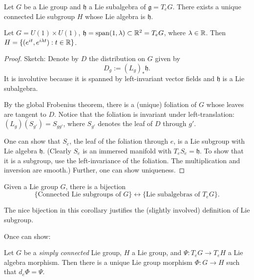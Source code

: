 \begin{prop}[C]
    Let $G$ be a Lie group and $\mathfrak h$ a Lie subalgebra of $\mathfrak g = T_eG$.
    There exists a unique connected Lie subgroup $H$ whose Lie algebra is $\mathfrak h$.
\end{prop}
\begin{eg}
    Let $G = U(1) \times U(1)$, $\mathfrak h = \operatorname{span}(1, \lambda) \subset  \mathbb{R}^2 = T_eG$, where $\lambda \in \mathbb{R}$.
    Then $H = \{(e^{it}, e^{i \lambda t}) : t \in \mathbb{R}\}$.
\end{eg}
\vspace*{12pt}
\begin{proof} Sketch:
    Denote by $D$ the distribution on $G$ given by 
    \[
        D_g := (L_g)_* \mathfrak h
    .\] 
It is involutive because it is spanned by left-invariant vector fields and $\mathfrak h$ is a Lie subalgebra.

 By the global  Frobenius theorem, there is a (unique) foliation of $G$ whose leaves are tangent to $D$. Notice that the foliation is invariant under left-translation: $(L_g)(S_{g'})=S_{gg'}$, where $S_{g'}$ denotes the leaf of $D$ through $g'$.
 
 One can show that $S_e$, the leaf of the foliation through $e$, is a Lie subgroup with Lie algebra $ \mathfrak h$.
 (Clearly $S_e$ is an immersed manifold with $T_eS_e=\mathfrak h$. To show that it is a subgroup, use   the left-invariance of the foliation. The multiplication and inversion are smooth.) Further, one can show uniqueness.
\end{proof}

 
\begin{corollary}
    Given a Lie group $G$, there is a bijection 
    $$ \{\text{Connected Lie subgroups of $G$}\}\leftrightarrow \{\text{Lie subalgebras of $T_eG$}\}.$$
\end{corollary}
\begin{remark}
The nice bijection in this corollary justifies the (slightly involved) definition of Lie subgroup. 
\end{remark}

Once can show:
\begin{prop}[B]
    Let $G$ be a \emph{simply connected} Lie  group, $H$ a Lie group, and $ \Psi: T_eG \to  T_eH $ a Lie algebra morphism.
    Then there is a unique Lie group morphism $\Phi: G \to  H$ such that $d_e \Phi = \Psi$.
\end{prop}
 
